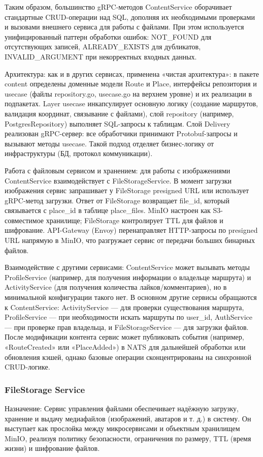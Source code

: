 \noindent Таким образом, большинство gRPC-методов ContentService оборачивает стандартные CRUD-операции над SQL, дополняя их необходимыми проверками и вызовами внешнего сервиса для работы с файлами. При этом используется унифицированный паттерн обработки ошибок: NOT\_FOUND для отсутствующих записей, ALREADY\_EXISTS для дубликатов, INVALID\_ARGUMENT при некорректных входных данных.

Архитектура: как и в других сервисах, применена «чистая архитектура»: в пакете content определены доменные модели Route и Place, интерфейсы репозитория и usecase (файлы repository.go, usecase.go на верхнем уровне) и их реализации в подпакетах. Layer usecase инкапсулирует основную логику (создание маршрутов, валидация координат, связывание с файлами), слой repository (например, PostgresRepository) выполняет SQL-запросы к таблицам. Слой Delivery реализован gRPC-сервер: все обработчики принимают Protobuf-запросы и вызывают методы usecase. Такой подход отделяет бизнес-логику от инфраструктуры (БД, протокол коммуникации).

Работа с файловым сервисом и хранением: для работы с изображениями ContentService взаимодействует с FileStorageService. В момент загрузки изображения сервис запрашивает у FileStorage presigned URL или использует gRPC-метод загрузки. Ответ от FileStorage возвращает file\_id, который связывается с place\_id в таблице place\_files. MinIO настроен как S3-совместимое хранилище; FileStorage контролирует TTL для файлов и шифрование. API-Gateway (Envoy) перенаправляет HTTP-запросы по presigned URL напрямую в MinIO, что разгружает сервис от передачи больших бинарных файлов.

Взаимодействие с другими сервисами: ContentService может вызывать методы ProfileService (например, для получения информации о владельце маршрута) и ActivityService (для получения количества лайков/комментариев), но в минимальной конфигурации такого нет. В основном другие сервисы обращаются к ContentService: ActivityService — для проверки существования маршрута, ProfileService — при необходимости искать маршруты по user\_id, AuthService — при проверке прав владельца, и FileStorageService — для загрузки файлов. После модификации контента сервис может публиковать события (например, «RouteCreated» или «PlaceAdded») в NATS для дальнейшей обработки или обновления кэшей, однако базовые операции сконцентрированы на синхронной CRUD-логике.

\subsubsection*{FileStorage Service}
Назначение: Сервис управления файлами обеспечивает надёжную загрузку, хранение и выдачу медиафайлов (изображений, аватаров и т. д.) в систему. Он выступает как прослойка между микросервисами и объектным хранилищем MinIO, реализуя политику безопасности, ограничения по размеру, TTL (время жизни) и шифрование файлов.

